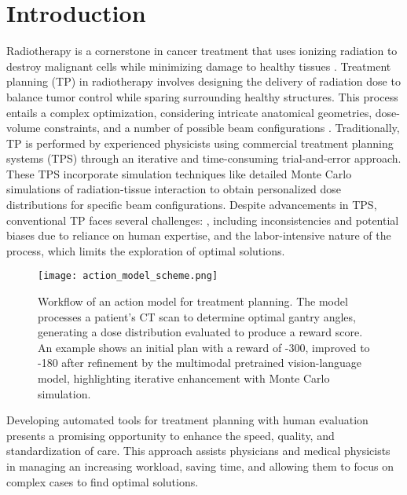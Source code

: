 \documentclass[runningheads]{llncs}
\begin{document}
\section{Introduction}

Radiotherapy is a cornerstone in cancer treatment that uses ionizing radiation to destroy malignant cells while minimizing damage to healthy tissues \cite{radiotherapy, radiotherapy_general}. Treatment planning (TP) in radiotherapy involves designing the delivery of radiation dose to balance tumor control while sparing surrounding healthy structures. This process entails a complex optimization, considering intricate anatomical geometries, dose-volume constraints, and a number of possible beam configurations \cite{Zarepisheh2022-uf, Bortfeld2006}. Traditionally, TP is performed by experienced physicists using commercial treatment planning systems (TPS) through an iterative and time-consuming trial-and-error approach. These TPS incorporate simulation techniques like detailed Monte Carlo simulations of radiation-tissue interaction to obtain personalized dose distributions for specific beam configurations. Despite advancements in TPS, conventional TP faces several challenges: \cite{Mayadev2022-jf, radiotherapy_challenge_schemes, radiotherapy_variability}, including inconsistencies and potential biases due to reliance on human expertise, and the labor-intensive nature of the process, which limits the exploration of optimal solutions.

\begin{figure}
    \centering
    \texttt{[image: action\_model\_scheme.png]}
\caption{Workflow of an action model for treatment planning. The model processes a patient's CT scan to determine optimal gantry angles, generating a dose distribution evaluated to produce a reward score. An example shows an initial plan with a reward of -300, improved to -180 after refinement by the multimodal pretrained vision-language model, highlighting iterative enhancement with Monte Carlo simulation.}
    \label{fig:enter-label}
\end{figure}

Developing automated tools for treatment planning with human evaluation presents a promising opportunity to enhance the speed, quality, and standardization of care. This approach assists physicians and medical physicists in managing an increasing workload, saving time, and allowing them to focus on complex cases to find optimal solutions. 
\end{document}
